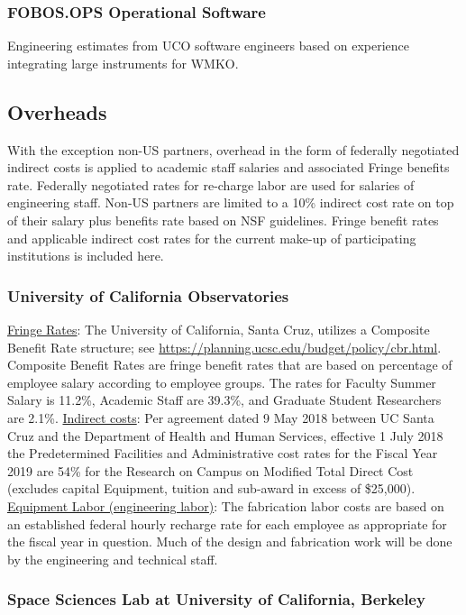 \documentclass[oneside,11pt]{amsart}
\begin{document}
\subsubsection{FOBOS.OPS Operational Software}

Engineering estimates from UCO software engineers based on experience
integrating large instruments for WMKO.

\subsection{Overheads}

With the exception non-US partners, overhead in the form of federally
negotiated indirect costs is applied to academic staff salaries and
associated Fringe benefits rate. Federally negotiated rates for
re-charge labor are used for salaries of engineering staff. Non-US
partners are limited to a 10\% indirect cost rate on top of their
salary plus benefits rate based on NSF guidelines. Fringe benefit
rates and applicable indirect cost rates for the current make-up of
participating institutions is included here.

\subsubsection{University of California Observatories}

\underline{Fringe Rates}: The University of California, Santa Cruz,
utilizes a Composite Benefit Rate
structure; see \url{https://planning.ucsc.edu/budget/policy/cbr.html}.
Composite Benefit Rates are fringe benefit rates that are based on
percentage of employee salary according to employee groups. The rates
for Faculty Summer Salary is 11.2\%, Academic Staff are 39.3\%, and
Graduate Student Researchers are 2.1\%. \underline{Indirect costs}:
Per agreement dated 9 May 2018 between UC Santa Cruz and the
Department of Health and Human Services, effective 1 July 2018 the
Predetermined Facilities and Administrative cost rates for the Fiscal
Year 2019 are 54\% for the Research on Campus on Modified Total
Direct Cost (excludes capital Equipment, tuition and sub-award in
excess of \$25,000). \underline{Equipment Labor (engineering labor)}:
The fabrication labor costs are based on an established federal
hourly recharge rate for each employee as appropriate for the fiscal
year in question. Much of the design and fabrication work will be
done by the engineering and technical staff.

\subsubsection{Space Sciences Lab at University of California, Berkeley}
\end{document}
